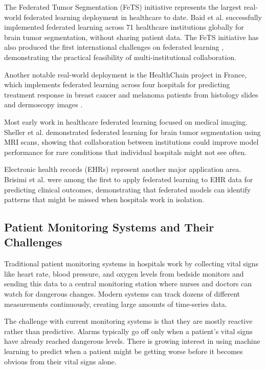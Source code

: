 \documentclass[3p,times,procedia]{elsarticle}
\begin{document}
The Federated Tumor Segmentation (FeTS) initiative represents the largest real-world federated learning deployment in healthcare to date. Baid et al. \cite{Baid2021} successfully implemented federated learning across 71 healthcare institutions globally for brain tumor segmentation, without sharing patient data. The FeTS initiative has also produced the first international challenges on federated learning \cite{Pati2021}, demonstrating the practical feasibility of multi-institutional collaboration.

Another notable real-world deployment is the HealthChain project in France, which implements federated learning across four hospitals for predicting treatment response in breast cancer and melanoma patients from histology slides and dermoscopy images \cite{Rieke2020}.

Most early work in healthcare federated learning focused on medical imaging. Sheller et al. \cite{Sheller2020} demonstrated federated learning for brain tumor segmentation using MRI scans, showing that collaboration between institutions could improve model performance for rare conditions that individual hospitals might not see often.

Electronic health records (EHRs) represent another major application area. Brisimi et al. \cite{Brisimi2018} were among the first to apply federated learning to EHR data for predicting clinical outcomes, demonstrating that federated models can identify patterns that might be missed when hospitals work in isolation.

\subsection{Patient Monitoring Systems and Their Challenges}

Traditional patient monitoring systems in hospitals work by collecting vital signs like heart rate, blood pressure, and oxygen levels from bedside monitors and sending this data to a central monitoring station where nurses and doctors can watch for dangerous changes. Modern systems can track dozens of different measurements continuously, creating large amounts of time-series data.

The challenge with current monitoring systems is that they are mostly reactive rather than predictive. Alarms typically go off only when a patient's vital signs have already reached dangerous levels. There is growing interest in using machine learning to predict when a patient might be getting worse before it becomes obvious from their vital signs alone.
\end{document}
